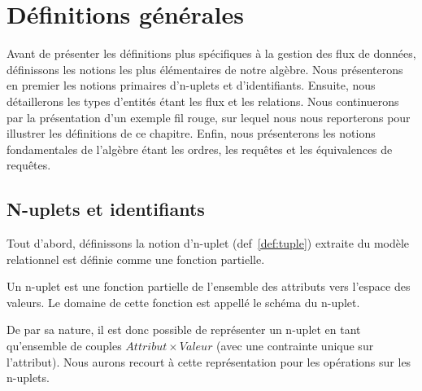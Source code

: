 \section{Définitions générales}\label{sec:contrib:astral:definitions}
Avant de présenter les définitions plus spécifiques à la gestion des flux de données, définissons les notions les plus élémentaires de notre algèbre. Nous présenterons en premier les notions primaires d'n-uplets et d'identifiants. Ensuite, nous détaillerons les types d'entités étant les flux et les relations. Nous continuerons par la présentation d'un exemple fil rouge, sur lequel nous nous reporterons pour illustrer les définitions de ce chapitre. Enfin, nous présenterons les notions fondamentales de l'algèbre étant les ordres, les requêtes et les équivalences de requêtes.

\subsection{N-uplets et identifiants}
Tout d'abord, définissons la notion d'n-uplet (def~\ref{def:tuple}) extraite du modèle relationnel est définie comme une fonction partielle.
\begin{defi}[n-uplet]\label{def:tuple}
    Un n-uplet est une fonction partielle de l'ensemble des attributs vers l'espace des valeurs. Le domaine de cette fonction est appellé le schéma du n-uplet.
\end{defi}

De par sa nature, il est donc possible de représenter un n-uplet en tant qu'ensemble de couples $Attribut\times Valeur$ (avec une contrainte unique sur l'attribut). Nous aurons recourt à cette représentation pour les opérations sur les n-uplets.

